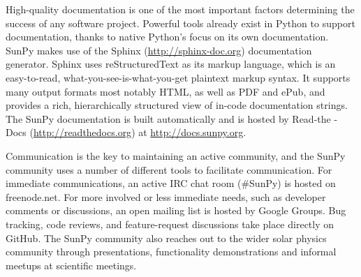 High-quality documentation is
one of the most important factors determining the success of any software project. 
Powerful tools already exist in Python to support documentation, thanks to native
Python's focus on its own documentation. SunPy makes use of the Sphinx (\url{http://sphinx-doc.org})
documentation generator. Sphinx uses reStructuredText as its markup language, which is
an easy-to-read, what-you-see-is-what-you-get plaintext markup syntax. It supports
many output formats most notably HTML, as well as PDF and ePub, and provides a rich,
hierarchically structured view of in-code documentation strings. The SunPy documentation 
is built automatically and is hosted by Read-the 
-Docs (\url{http://readthedocs.org}) at \url{http://docs.sunpy.org}. 

Communication is the key to maintaining an active community, and the SunPy community 
uses a number of different tools to facilitate communication. For immediate communications, an active IRC chat
room (\#SunPy) is hosted on freenode.net. For more involved or less immediate needs, such as
developer comments or discussions, an open mailing list is hosted by Google Groups. 
Bug tracking, code reviews, and feature-request discussions take place directly on GitHub.
The SunPy community also reaches out to the wider solar physics
community through presentations, functionality demonstrations and informal meetups at scientific
meetings. 